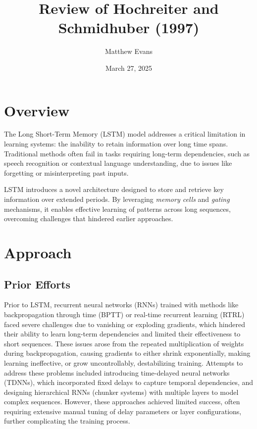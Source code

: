 \documentclass[10pt]{article}
\title{
    Review of Hochreiter and Schmidhuber (1997) \\
}
\author{Matthew Evans}
\date{March 27, 2025}
\begin{document}
\maketitle

\section*{Overview}

The Long Short-Term Memory (LSTM)\cite{6795963} model addresses a critical limitation in learning systems: the inability to retain information over long time spans. Traditional methods often fail in tasks requiring long-term dependencies, such as speech recognition or contextual language understanding, due to issues like forgetting or misinterpreting past inputs.

LSTM introduces a novel architecture designed to store and retrieve key information over extended periods. By leveraging \textit{memory cells} and \textit{gating} mechanisms, it enables effective learning of patterns across long sequences, overcoming challenges that hindered earlier approaches.


\section*{Approach}

\subsection*{Prior Efforts}

Prior to LSTM, recurrent neural networks (RNNs) trained with methods like backpropagation through time (BPTT) or real-time recurrent learning (RTRL) faced severe challenges due to vanishing or exploding gradients, which hindered their ability to learn long-term dependencies and limited their effectiveness to short sequences. These issues arose from the repeated multiplication of weights during backpropagation, causing gradients to either shrink exponentially, making learning ineffective, or grow uncontrollably, destabilizing training. Attempts to address these problems included introducing time-delayed neural networks (TDNNs)\cite{LANG199023}, which incorporated fixed delays to capture temporal dependencies, and designing hierarchical RNNs (chunker systems)\cite{6795261} with multiple layers to model complex sequences. However, these approaches achieved limited success, often requiring extensive manual tuning of delay parameters or layer configurations, further complicating the training process.
\end{document}
